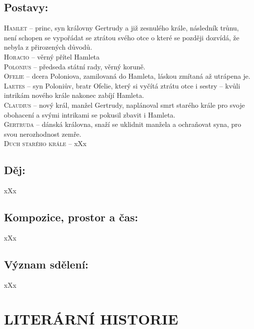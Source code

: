 \documentclass[A4paper]{extarticle} %
\begin{document}
\subsection*{Postavy:}
\noindent 
\textsc{Hamlet --} princ, syn královny Gertrudy a již zesnulého krále, následník trůnu, není schopen se vypořádat se ztrátou svého otce o které se později dozvídá, že nebyla z přirozených důvodů. \\
\textsc{Horacio --} věrný přítel Hamleta \\
\textsc{Polonius --} předseda státní rady, věrný koruně. \\
\textsc{Ofelie --} dcera Poloniova, zamilovaná do Hamleta, láskou zmítaná až utrápena je. \\
\textsc{Laetes --} syn Poloniův, bratr Ofelie, který si vyčítá ztrátu otce i sestry -- kvůli intrikám nového krále nakonec zabíjí Hamleta. \\
\textsc{Claudius --} nový král, manžel Gertrudy, naplánoval smrt starého krále pro svoje obohacení a svými intrikami se pokusil zbavit i Hamleta. \\
\textsc{Gertruda --} dánská královna, snaží se uklidnit manžela a ochraňovat syna, pro svou nerozhodnost zemře. \\
\textsc{Duch starého krále --} xXx 

\subsection*{Děj:}
\noindent 
xXx

\subsection*{Kompozice, prostor a čas:}
\noindent 
xXx

\subsection*{Význam sdělení:}
\noindent 
xXx

\section*{LITERÁRNÍ HISTORIE}


\end{document}
